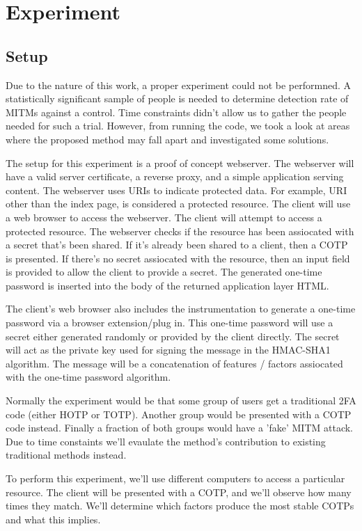 \documentclass[a4paper, 11pt]{article} 				%
\begin{document}
\section{Experiment}				%
\subsection{Setup}
Due to the nature of this work, a proper experiment could not be performned. A statistically significant sample of people is needed to determine detection rate of MITMs against a control. Time constraints didn't allow us to gather the people needed for such a trial. However, from running the code, we took a look at areas where the proposed method may fall apart and investigated some solutions.

The setup for this experiment is a proof of concept webserver. The webserver will have a valid server certificate, a reverse proxy, and a simple application serving content. The webserver uses URIs to indicate protected data. For example, URI other than the index page, is considered a protected resource. The client will use a web browser to access the webserver. The client will attempt to access a protected resource. The webserver checks if the resource has been assiocated with a secret that's been shared. If it's already been shared to a client, then a COTP is presented. If there's no secret assiocated with the resource, then an input field is provided to allow the client to provide a secret. The generated one-time password is inserted into the body of the returned application layer HTML. 

The client's web browser also includes the instrumentation to generate a one-time password via a browser extension/plug in. This one-time password will use a secret either generated randomly or provided by the client directly. The secret will act as the private key used for signing the message in the HMAC-SHA1 algorithm. The message will be a concatenation of features / factors assiocated with the one-time password algorithm.

Normally the experiment would be that some group of users get a traditional 2FA code (either HOTP or TOTP). Another group would be presented with a COTP code instead. Finally a fraction of both groups would have a 'fake' MITM attack. Due to time constaints we'll evaulate the method's contribution to existing traditional methods instead.

To perform this experiment, we'll use different computers to access a particular resource. The client will be presented with a COTP, and we'll observe how many times they match. We'll determine which factors produce the most stable COTPs and what this implies.
\end{document}
